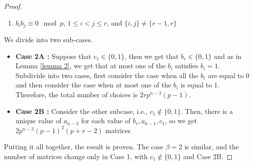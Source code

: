 \documentclass[a4paper]{amsart}
\numberwithin{equation}{section}
\theoremstyle{remark}
\begin{document}
\begin{proof}
\begin{enumerate}
\item $b_ib_j \equiv 0 \mod p$, $1 \leq i < j \leq r$, and $\{i,j\} \neq \{r-1,r\}$
\end{enumerate}
We divide into two sub-cases.
\begin{itemize}
    \item \textbf{Case 2A :} Suppose that $c_1 \in \{0,1\}$, then we get that $b_r \in \{0,1\}$ and as in Lemma \ref{lemma 2}, we get that at most one of the $b_i$ satisfies $b_i=1$. Subdivide into two cases, first consider the case when all the $b_i$ are equal to $0$ and then consider the case when at most one of the $b_i$ is equal to $1$. Therefore, the total number of choices is $2rp^{n-3}(p-1)$.
    \item \textbf{Case 2B :} Consider the other subcase, i.e., $c_1 \notin \{0,1\}$. Then, there is a unique value of $a_{n-3}$ for each value of $b_r, a_{k-1}, c_1$, so we get $2p^{n-3}(p-1)^2(p+r-2)$ matrices
\end{itemize}
Putting it all together, the result is proven. The case $\beta = 2$ is similar, and the number of matrices change only in Case 1, with $c_1\notin \{0,1\}$ and Case 2B.
\end{proof}
\end{document}
